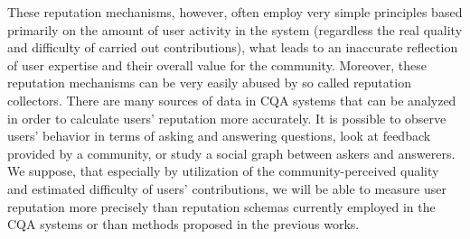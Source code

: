 \documentclass{llncs}
\begin{document}
		These reputation mechanisms, however, often employ very simple principles
		based primarily on the amount of user activity in the system (regardless the real
		quality and difficulty of carried out contributions), what leads to an inaccurate
		reflection of user expertise and their overall value for the community. Moreover,
		these reputation mechanisms can be very easily abused by so called reputation
		collectors. There are many sources of data in CQA systems that can be analyzed
		in order to calculate users’ reputation more accurately. It is possible to observe
		users’ behavior in terms of asking and answering questions, look at feedback
		provided by a community, or study a social graph between askers and answerers.
		We suppose, that especially by utilization of the community-perceived quality
		and estimated difficulty of users’ contributions, we will be able to measure user
		reputation more precisely than reputation schemas currently employed in the
		CQA systems or than methods proposed in the previous works.
\end{document}

